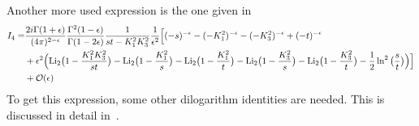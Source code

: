 Another more used expression is the one given in~\cite{Bern:1993kr}
\begin{equation}\label{i4bdk}
\begin{split}
I_4 = &\frac{2i\Gamma(1+\epsilon)}{(4\pi)^{2-\epsilon}}\frac{ \Gamma^2(1-\epsilon)}{\Gamma(1-2\epsilon)}\frac{1}{st-K_1^2K_3^2}\frac{1}{\epsilon^2}
\Big[
(-s)^{-\epsilon} - (-K_1^2)^{-\epsilon} - (-K_3^2)^{-\epsilon} + (-t)^{-\epsilon}
\\&
+\epsilon^2\Big(
\mathrm{Li}_2\big(1-\frac{K_1^2K_3^2}{st}\big) 
-\mathrm{Li}_2\big(1-\frac{K_1^2}{s}\big) 
-\mathrm{Li}_2\big(1-\frac{K_1^2}{t}\big) 
-\mathrm{Li}_2\big(1-\frac{K_3^2}{s}\big) 
-\mathrm{Li}_2\big(1-\frac{K_3^2}{t}\big) 
-\frac{1}{2}\ln^2\big(\frac{s}{t}\big)
\Big)
\Big]
\\ &
+\mathcal{O}(\epsilon)
\end{split}
\end{equation}
To get this expression, some other dilogarithm identities are needed.
This is discussed in detail in~\cite{Duplancic:2000sk}.
%
%
%
\iffalse %
